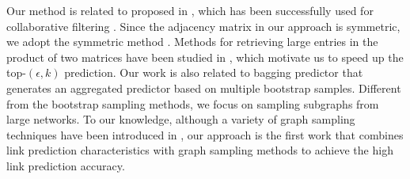 Our method is related to \NMF proposed in \cite{NMF-nature99}, which
has been successfully used for collaborative
filtering \cite{web}. Since the adjacency matrix in our approach is symmetric, we adopt
the symmetric \NMF method \cite{ding}.  Methods for retrieving large entries in the product of
two matrices have been studied in \cite{ballard2015, lemp}, which motivate us to speed up the
top-$(\epsilon, k)$ prediction. Our work is also related
to bagging predictor \cite{Breiman96b-1996} that generates an aggregated
predictor based on multiple bootstrap samples. Different from the bootstrap
sampling methods, we focus on sampling subgraphs from large networks. To our knowledge, although a
variety of graph sampling techniques have been introduced
in \cite{ahmed2014tkdd,chierichetti2016}, our approach is the first work that combines link
prediction characteristics \cite{leskovec-2008} with graph sampling
methods to achieve the high link prediction accuracy.






